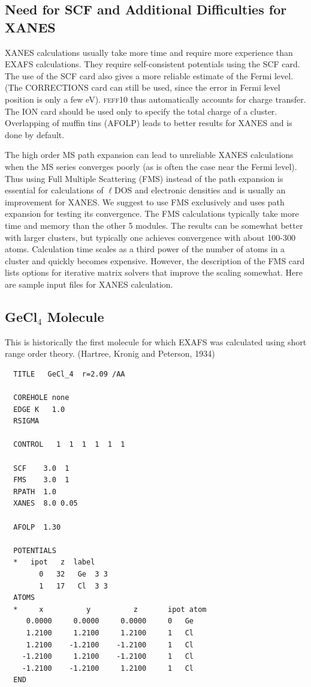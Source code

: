 \documentclass[11pt,oneside]{report} %
\newcommand{\feffcurrent}{\textsc{feff10}}
\renewcommand{\htmlref}[2]{\hyperlink{#2}{#1}}
\renewcommand{\htmlref}[2]{{#1}} %
\begin{document}
\subsection{Need for SCF and Additional Difficulties for XANES}
\label{sec:Addit-diff}
XANES calculations usually take more time and require more experience than EXAFS calculations.
They require self-consistent potentials using the \htmlref{SCF}{card:scf} card. The use of the SCF card 
also gives a more reliable estimate of the Fermi level.  (The CORRECTIONS card
can still be used, since the error in Fermi level position is only a few eV).
{\feffcurrent} thus automatically accounts for charge transfer. The ION card should 
be used only to specify the total charge of a cluster. Overlapping of muffin tins (AFOLP) leads to better results for XANES and is done by default.

The high order MS path expansion can lead to unreliable XANES calculations when the MS series converges
poorly (as is often the case near the Fermi level). Thus using Full Multiple Scattering (FMS) instead of the path expansion is essential for calculations of $\ell$DOS and
electronic densities and is usually an improvement for XANES. We suggest to use FMS exclusively and uses path expansion for testing its convergence.  The FMS calculations
typically take more time and memory than the other 5 modules. The
results can be somewhat better with larger clusters, but typically
one achieves convergence with about 100-300 atoms.  Calculation
time scales as a third power of the number of atoms in a cluster and
quickly becomes expensive.  However, the description of the FMS card lists options for iterative matrix solvers that improve
the scaling somewhat.
Here are sample input files for XANES calculation.


\subsection{GeCl$_4$ Molecule}
\label{sec:Molecule-1}

This is historically the first molecule for which EXAFS was calculated using short range order
theory. (Hartree, Kronig and Peterson, 1934)

\begin{verbatim}
  TITLE   GeCl_4  r=2.09 /AA
  
  COREHOLE none
  EDGE K   1.0
  RSIGMA
  
  CONTROL   1  1  1  1  1  1
  
  SCF    3.0  1
  FMS    3.0  1
  RPATH  1.0
  XANES  8.0 0.05
  
  AFOLP  1.30
  
  POTENTIALS
  *   ipot   z  label
        0   32   Ge  3 3
        1   17   Cl  3 3
  ATOMS
  *     x          y          z       ipot atom        
     0.0000     0.0000     0.0000     0   Ge
     1.2100     1.2100     1.2100     1   Cl
     1.2100    -1.2100    -1.2100     1   Cl
    -1.2100     1.2100    -1.2100     1   Cl
    -1.2100    -1.2100     1.2100     1   Cl
  END
\end{verbatim}
\end{document}
